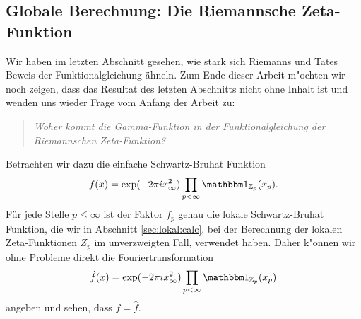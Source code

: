 \subsection{Globale Berechnung: Die Riemannsche Zeta-Funktion}
	Wir haben im letzten Abschnitt gesehen, wie stark sich Riemanns und Tates Beweis der Funktionalgleichung ähneln.
	Zum Ende dieser Arbeit m"ochten wir noch zeigen, dass das Resultat des letzten Abschnitts nicht ohne Inhalt ist und wenden uns wieder Frage vom Anfang der Arbeit zu:
	\begin{quote}
		\centering
		\textit{Woher kommt die Gamma-Funktion in der Funktionalgleichung der Riemannschen Zeta-Funktion?}
	\end{quote}
	Betrachten wir dazu die einfache Schwartz-Bruhat Funktion
	\begin{align*}
		f(x) = \exp(-2\pi i x_\infty^2) \prod_{p<\infty} \ind_{\Zp}(x_p).
	\end{align*}
	Für jede Stelle $p\leq \infty$ ist der Faktor $f_p$ genau die lokale Schwartz-Bruhat Funktion, die wir in Abschnitt \ref{sec:lokal:calc}, bei der Berechnung der lokalen Zeta-Funktionen $Z_p$ im unverzweigten Fall, verwendet haben.
	Daher k"onnen wir ohne Probleme direkt die Fouriertransformation
	\begin{align*}
		\hat{f}(x) = \exp(-2\pi i x_\infty^2) \prod_{p<\infty} \ind_{\Zp}(x_p)
	\end{align*}
	angeben und sehen, dass $f = \hat{f}$.
	
